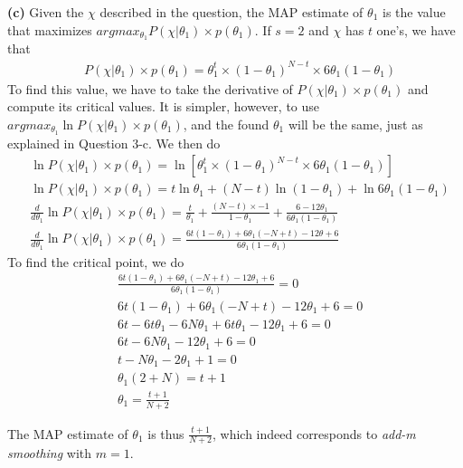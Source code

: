 \documentclass[leqno]{article}
\begin{document}
\noindent \textbf{(c)} Given the $\chi$ described in the question, the MAP estimate of $\theta_1$ is the value that maximizes 
 $argmax_{\theta_1} P(\chi|\theta_1) \times p(\theta_1)$. If $s = 2$ and $\chi$ has $t$ one's, we have that
\begin{equation*}
\begin{split}
&P(\chi|\theta_1) \times p(\theta_1) = \theta_1^t \times (1 - \theta_1)^{N - t} \times 6\theta_1(1 - \theta_1)
\end{split}  
\end{equation*} 
To find this value, we have to take the derivative of $P(\chi|\theta_1) \times p(\theta_1)$ and compute its critical values. It is simpler, however, 
to use $argmax_{\theta_1} \ln P(\chi|\theta_1) \times p(\theta_1)$, and the found $\theta_1$ will be the same, just as explained in Question 3-c. 
We then do
\begin{equation*}
\begin{split}
&\ln P(\chi|\theta_1) \times p(\theta_1) = \ln[\theta_1^t \times (1 - \theta_1)^{N - t} \times 6\theta_1(1 - \theta_1)]
\\
&\ln P(\chi|\theta_1) \times p(\theta_1) = t\ln \theta_1 + (N - t) \ln (1 - \theta_1) + \ln 6\theta_1(1 - \theta_1)
\\
&\frac{d}{d\theta_1}\ln P(\chi|\theta_1) \times p(\theta_1) = \frac{t}{\theta_1} + \frac{(N - t) \times -1}{1 - \theta_1} + \frac{6 - 12\theta_1}{6\theta_1(1 - \theta_1)}
\\
&\frac{d}{d\theta_1}\ln P(\chi|\theta_1) \times p(\theta_1) = \frac{6t(1 - \theta_1) + 6\theta_1(-N + t) - 12\theta + 6}{6\theta_1(1 - \theta_1)}
\end{split}  
\end{equation*} 
To find the critical point, we do
\begin{equation*}
\begin{split}
&\frac{6t(1 - \theta_1) + 6\theta_1(-N + t) - 12\theta_1 + 6}{6\theta_1(1 - \theta_1)} = 0
\\
& 6t(1 - \theta_1) + 6\theta_1(-N + t) - 12\theta_1 + 6 = 0
\\
& 6t - 6t\theta_1 - 6N\theta_1 + 6t\theta_1 -12\theta_1 + 6 = 0
\\
&6t - 6N\theta_1 -12\theta_1 + 6 = 0
\\
&t - N\theta_1 -2\theta_1 + 1 = 0
\\
&\theta_1(2 + N) = t + 1
\\
&\theta_1 = \frac{t + 1}{N + 2}
\end{split}  
\end{equation*} 

The MAP estimate of $\theta_1$ is thus $\frac{t + 1}{N + 2}$, which indeed corresponds to \textit{add-m smoothing} with $m = 1$.  
\end{document}
